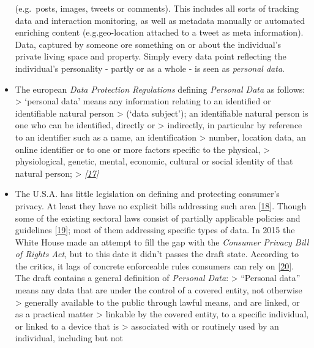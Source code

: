 \documentclass[12pt,english,a4paper,titlepage,cleardoublepage=empty,dottedtoc]{report}
\begin{document}
\begin{itemize}
  (e.g.~posts, images, tweets or comments). This includes all sorts of
  tracking data and interaction monitoring, as well as metadata manually
  or automated enriching content (e.g.geo-location attached to a tweet
  as meta information). Data, captured by someone ore something on or
  about the individual's private living space and property. Simply every
  data point reflecting the individual's personality - partly or as a
  whole - is seen as \emph{personal data}.
\item
  The european \emph{Data Protection Regulations} defining
  \emph{Personal Data} as follows: \textgreater{} `personal data' means
  any information relating to an identified or identifiable natural
  person \textgreater{} (`data subject'); an identifiable natural person
  is one who can be identified, directly or \textgreater{} indirectly,
  in particular by reference to an identifier such as a name, an
  identification \textgreater{} number, location data, an online
  identifier or to one or more factors specific to the physical,
  \textgreater{} physiological, genetic, mental, economic, cultural or
  social identity of that natural person; \textgreater{}
  \emph{{[}\protect\hyperlink{ref-regulation_2016_eu_general-data-protection-regulation_definition}{17}{]}}
\item
  The U.S.A. has little legislation on defining and protecting
  consumer's privacy. At least they have no explicit bills addressing
  such area
  {[}\protect\hyperlink{ref-web_2016_wikipedia_information-privacy-law_us}{18}{]}.
  Though some of the existing sectoral laws consist of partially
  applicable policies and guidelines
  {[}\protect\hyperlink{ref-web_2016_data-protection-laws-in-the-us}{19}{]};
  most of them addressing specific types of data. In 2015 the White
  House made an attempt to fill the gap with the \emph{Consumer Privacy
  Bill of Rights Act}, but to this date it didn't passes the draft
  state. According to the critics, it lags of concrete enforceable rules
  consumers can rely on
  {[}\protect\hyperlink{ref-web_2015_white-house-releases-consumer-privacy-bill-draft}{20}{]}.
  The draft contains a general definition of \emph{Personal Data}:
  \textgreater{} ``Personal data'' means any data that are under the
  control of a covered entity, not otherwise \textgreater{} generally
  available to the public through lawful means, and are linked, or as a
  practical matter \textgreater{} linkable by the covered entity, to a
  specific individual, or linked to a device that is \textgreater{}
  associated with or routinely used by an individual, including but not

\end{itemize}
\end{document}
